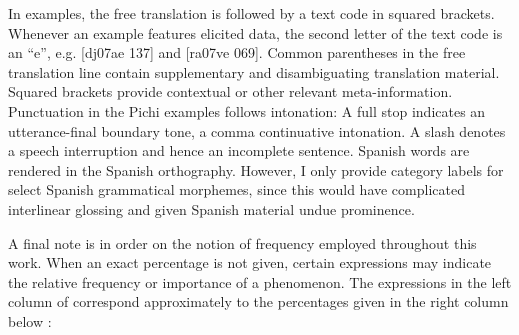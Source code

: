 In examples, the free translation is followed by a text code in squared brackets. Whenever an example features elicited data, the second letter of the text code is an “e”, e.g. [dj07ae 137] and [ra07ve 069]. Common parentheses in the free translation line contain supplementary and disambiguating translation material. Squared brackets provide contextual or other relevant meta-information. Punctuation in the Pichi examples follows intonation: A full stop indicates an utterance-final boundary tone, a comma continuative intonation. A slash denotes a speech interruption and hence an incomplete sentence. Spanish words are rendered in the Spanish orthography. However, I only provide category labels for select Spanish grammatical morphemes, since this would have complicated interlinear glossing and given Spanish material undue prominence. 


A final note is in order on the notion of frequency employed throughout this work. When an exact percentage is not given, certain expressions may indicate the relative frequency or importance of a phenomenon. The expressions in the left column of  correspond approximately to the percentages given in the right column below \citep{MichaelisEtAl2013}:


